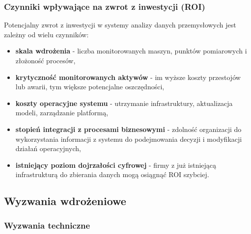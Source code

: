 \subsubsection{Czynniki wpływające na zwrot z inwestycji (ROI)}
\label{subsubsec:analiza_roi}

Potencjalny zwrot z inwestycji w systemy analizy danych przemysłowych jest zależny od wielu czynników:

\begin{itemize}
    \item \textbf{skala wdrożenia} - liczba monitorowanych maszyn, punktów pomiarowych i złożoność procesów,
    \item \textbf{krytyczność monitorowanych aktywów} - im wyższe koszty przestojów lub awarii, tym większe potencjalne oszczędności,
    \item \textbf{koszty operacyjne systemu} - utrzymanie infrastruktury, aktualizacja modeli, zarządzanie platformą,
    \item \textbf{stopień integracji z procesami biznesowymi} - zdolność organizacji do wykorzystania informacji z systemu do podejmowania decyzji i modyfikacji działań operacyjnych,
    \item \textbf{istniejący poziom dojrzałości cyfrowej} - firmy z już istniejącą infrastrukturą do zbierania danych mogą osiągnąć ROI szybciej.
\end{itemize}


\subsection{Wyzwania wdrożeniowe}
\label{subsec:wyzwania_wdrozeniowe}

\subsubsection{Wyzwania techniczne}
\label{subsubsec:wyzwania_techniczne}

